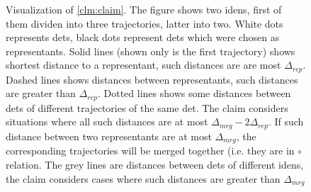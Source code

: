 \begin{figure}
    \centering
    \def\svgwidth{\columnwidth}
    
    \caption[Visualization of \autoref{clm:claim}]{Visualization of  \autoref{clm:claim}. The figure shows two \glspl{iden}, first of them dividen into three trajectories, latter into two. White dots represents \glspl{det}, black dots represent \glspl{det} which were chosen as representants. Solid lines (shown only is the first trajectory) shows shortest distance to a representant, such distances are are most $\Delta_{rep}$. Dashed lines shows distances between representants, such distances are greater than $\Delta_{rep}$. Dotted lines shows some distances between \glspl{det} of different trajectories of the same \gls{det}. The claim considers situations where all such distances are at most $\Delta_{mrg} - 2\Delta_{rep}$. If such distance between two representants are at most $\Delta_{mrg}$, the corresponding trajectories will be merged together (i.e. they are in $\circ$ relation. The grey lines are distances between \glspl{det} of different \glspl{iden}, the claim considers cases where such distances are greater than $\Delta_{mrg}$}
    \label{fig:claim}
\end{figure}


